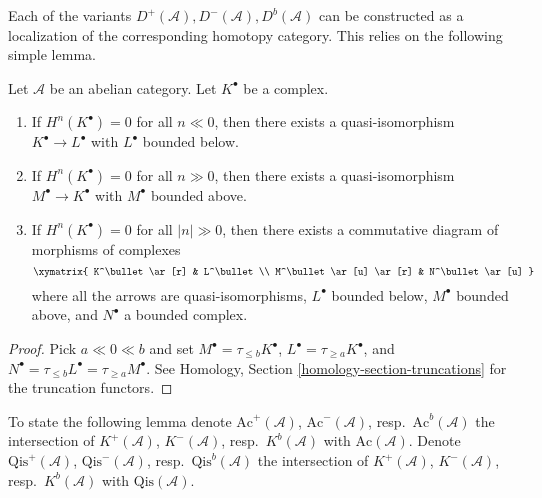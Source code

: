 \noindent
Each of the variants $D^{+}(\mathcal{A}), D^{-}(\mathcal{A}), D^b(\mathcal{A})$
can be constructed as a localization of the corresponding homotopy category.
This relies on the following simple lemma.

\begin{lemma}
\label{lemma-complex-cohomology-bounded}
Let $\mathcal{A}$ be an abelian category.
Let $K^\bullet$ be a complex.
\begin{enumerate}
\item If $H^n(K^\bullet) = 0$ for all $n \ll 0$, then there exists
a quasi-isomorphism $K^\bullet \to L^\bullet$ with $L^\bullet$
bounded below.
\item If $H^n(K^\bullet) = 0$ for all $n \gg 0$, then there exists
a quasi-isomorphism $M^\bullet \to K^\bullet$ with $M^\bullet$
bounded above.
\item If $H^n(K^\bullet) = 0$ for all $|n| \gg 0$, then there exists
a commutative diagram of morphisms of complexes
$$
\xymatrix{
K^\bullet \ar[r] & L^\bullet \\
M^\bullet \ar[u] \ar[r] & N^\bullet \ar[u]
}
$$
where all the arrows are quasi-isomorphisms, $L^\bullet$
bounded below, $M^\bullet$ bounded above, and $N^\bullet$ a bounded
complex.
\end{enumerate}
\end{lemma}

\begin{proof}
Pick $a \ll 0 \ll b$ and set $M^\bullet = \tau_{\leq b}K^\bullet$,
$L^\bullet = \tau_{\geq a}K^\bullet$, and
$N^\bullet = \tau_{\leq b}L^\bullet = \tau_{\geq a}M^\bullet$.
See
Homology, Section \ref{homology-section-truncations}
for the truncation functors.
\end{proof}

\noindent
To state the following lemma denote
$\text{Ac}^{+}(\mathcal{A})$, $\text{Ac}^{-}(\mathcal{A})$,
resp.\ $\text{Ac}^b(\mathcal{A})$ the intersection of
$K^{+}(\mathcal{A})$, $K^{-}(\mathcal{A})$, resp.\ $K^b(\mathcal{A})$
with $\text{Ac}(\mathcal{A})$.
Denote $\text{Qis}^{+}(\mathcal{A})$, $\text{Qis}^{-}(\mathcal{A})$,
resp.\ $\text{Qis}^b(\mathcal{A})$ the intersection of
$K^{+}(\mathcal{A})$, $K^{-}(\mathcal{A})$, resp.\ $K^b(\mathcal{A})$
with $\text{Qis}(\mathcal{A})$.

